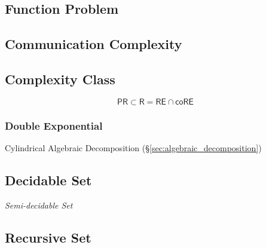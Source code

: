 \subsection{Function Problem}\label{sec:function_problem}

\subsection{Communication Complexity}\label{sec:communication_complexity}

\subsection{Complexity Class}\label{sec:complexity_class}

\[
  \mathsf{PR} \subset \mathsf{R} = \mathsf{RE} \cap \mathsf{coRE}
\]



\subsubsection{Double Exponential}\label{sec:double_exponential}

Cylindrical Algebraic Decomposition
(\S\ref{sec:algebraic_decomposition})



\subsection{Decidable Set}\label{sec:decidable_set}

\emph{Semi-decidable Set}



\subsection{Recursive Set}\label{sec:recursive_set}

